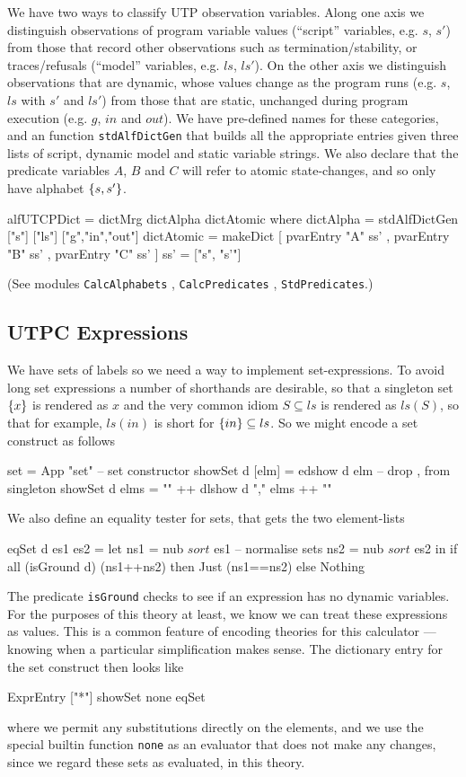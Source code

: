 We have two ways to classify UTP observation variables.
Along one axis we distinguish observations of program variable
values (``script'' variables, e.g. $s$, $s'$) from those that record other
observations such as termination/stability,
or traces/refusals (``model'' variables, e.g. $ls$, $ls'$).
On the other axis we distinguish observations
that are dynamic, whose values change as the program runs
(e.g. $s$, $ls$ with $s'$ and $ls'$)
from those that are static,
unchanged during program execution (e.g. $g$, $in$ and $out$).
We have pre-defined names for these categories,
and an function \texttt{stdAlfDictGen} that
builds all the appropriate entries
given three lists of script, dynamic model and static variable strings.
We also declare that the predicate variables $A$, $B$ and $C$
will refer to atomic state-changes,
and so only have alphabet $\{{s,s'}\}$.
\begin{code}
alfUTCPDict
 = dictMrg dictAlpha dictAtomic
 where
   dictAlpha = stdAlfDictGen ["s"] ["ls"] ["g","in","out"]
   dictAtomic = makeDict [ pvarEntry "A" ss'
                         , pvarEntry "B" ss'
                         , pvarEntry "C" ss' ]
   ss' = ["s", "s'"]
\end{code}
(See modules
\texttt{CalcAlphabets}
, \texttt{CalcPredicates}
, \texttt{StdPredicates}.)

\subsection{UTPC Expressions}

We have sets of labels
so we need a way to implement set-expressions.
To avoid long set expressions a number of shorthands are desirable,
so that a singleton set $\{{x}\}$ is rendered as $x$
and the very common idiom $S \subseteq ls$
is rendered as $ls(S)$,
so that for example, $ls(in)$ is short for $\{{in}\} \subseteq ls$.
So we might encode a set construct as follows
\begin{code}
set = App "set"                             -- set constructor
showSet d [elm] = edshow d elm      -- drop {,} from singleton
showSet d elms = "{" ++ dlshow d "," elms ++ "}"
\end{code}
We also define an equality tester for sets,
that gets the two element-lists
\begin{code}
eqSet d es1 es2
 = let ns1 = nub $ sort $ es1                -- normalise sets
       ns2 = nub $ sort $ es2
   in if all (isGround d) (ns1++ns2)
      then Just (ns1==ns2)
      else Nothing
\end{code}
The predicate \texttt{isGround} checks to see if an expression has no
dynamic variables.
For the purposes of this theory at least,
we know we can treat these expressions as values.
This is a common feature of encoding theories for this calculator%
---%
knowing when a particular simplification makes sense.
The dictionary entry for the set construct then looks like
\begin{code}
ExprEntry ["*"] showSet none eqSet
\end{code}
where we permit any substitutions directly on the elements,
and we use the special builtin function \texttt{none}
as an evaluator that does not make any changes,
since we regard these sets as evaluated, in this theory.

